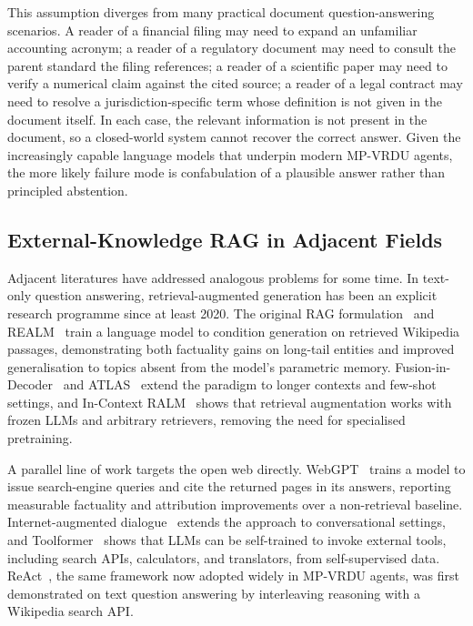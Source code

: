 \documentclass[11pt]{article}
\begin{document}
This assumption diverges from many practical document question-answering scenarios. A reader of a financial filing may need to expand an unfamiliar accounting acronym; a reader of a regulatory document may need to consult the parent standard the filing references; a reader of a scientific paper may need to verify a numerical claim against the cited source; a reader of a legal contract may need to resolve a jurisdiction-specific term whose definition is not given in the document itself. In each case, the relevant information is not present in the document, so a closed-world system cannot recover the correct answer. Given the increasingly capable language models that underpin modern MP-VRDU agents, the more likely failure mode is confabulation of a plausible answer rather than principled abstention.

\subsection{External-Knowledge RAG in Adjacent Fields}
Adjacent literatures have addressed analogous problems for some time. In text-only question answering, retrieval-augmented generation has been an explicit research programme since at least 2020. The original RAG formulation~\cite{lewis2020rag} and REALM~\cite{guu2020realm} train a language model to condition generation on retrieved Wikipedia passages, demonstrating both factuality gains on long-tail entities and improved generalisation to topics absent from the model's parametric memory. Fusion-in-Decoder~\cite{izacard2021fid} and ATLAS~\cite{izacard2022atlas} extend the paradigm to longer contexts and few-shot settings, and In-Context RALM~\cite{ram2023incontext} shows that retrieval augmentation works with frozen LLMs and arbitrary retrievers, removing the need for specialised pretraining.

A parallel line of work targets the open web directly. WebGPT~\cite{nakano2021webgpt} trains a model to issue search-engine queries and cite the returned pages in its answers, reporting measurable factuality and attribution improvements over a non-retrieval baseline. Internet-augmented dialogue~\cite{komeili2022internet} extends the approach to conversational settings, and Toolformer~\cite{schick2023toolformer} shows that LLMs can be self-trained to invoke external tools, including search APIs, calculators, and translators, from self-supervised data. ReAct~\cite{yao2022react}, the same framework now adopted widely in MP-VRDU agents, was first demonstrated on text question answering by interleaving reasoning with a Wikipedia search API.
\end{document}
